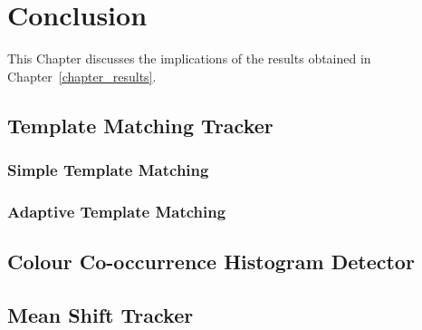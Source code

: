 \chapter{Conclusion}
This Chapter discusses the implications of the results obtained in
Chapter~\ref{chapter_results}. 

\section{Template Matching Tracker}

\subsection{Simple Template Matching}

\subsection{Adaptive Template Matching}


\section{Colour Co-occurrence Histogram Detector}


\section{Mean Shift Tracker}

